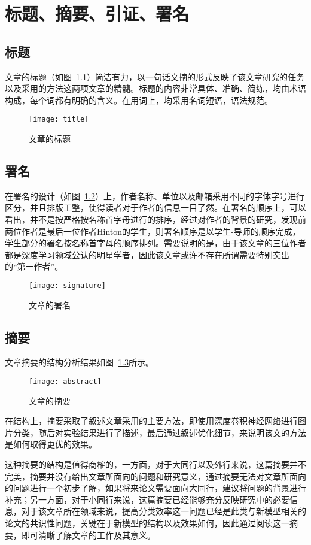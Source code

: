 \chapter{标题、摘要、引证、署名}\label{chap:other}
\section{标题}
文章的标题（如图~\ref{fig:title}）简洁有力，以一句话文摘的形式反映了该文章研究的任务以及采用的方法这两项文章的精髓。标题的内容非常具体、准确、简练，均由术语构成，每个词都有明确的含义。在用词上，均采用名词短语，语法规范。

\begin{figure}[!htbp]
	\centering
	\texttt{[image: title]}
	\caption{文章的标题}
	\label{fig:title}
\end{figure}

\section{署名}
在署名的设计（如图~\ref{fig:signature}）上，作者名称、单位以及邮箱采用不同的字体字号进行区分，并且排版工整，使得读者对于作者的信息一目了然。在署名的顺序上，可以看出，并不是按严格按名称首字母进行的排序，经过对作者的背景的研究，发现前两位作者是最后一位作者Hinton的学生，则署名顺序是以学生-导师的顺序完成，学生部分的署名按名称首字母的顺序排列。需要说明的是，由于该文章的三位作者都是深度学习领域公认的明星学者，因此该文章或许不存在所谓需要特别突出的“第一作者”。
\begin{figure}[!htbp]
	\centering
	\texttt{[image: signature]}
	\caption{文章的署名}
	\label{fig:signature}
\end{figure}

\section{摘要}
文章摘要的结构分析结果如图~\ref{fig:abstract}所示。

\begin{figure}[!htbp]
	\centering
	\texttt{[image: abstract]}
	\caption{文章的摘要}
	\label{fig:abstract}
\end{figure}

在结构上，摘要采取了叙述文章采用的主要方法，即使用深度卷积神经网络进行图片分类，随后对实验结果进行了描述，最后通过叙述优化细节，来说明该文的方法是如何取得更优的效果。

这种摘要的结构是值得商榷的，一方面，对于大同行以及外行来说，这篇摘要并不完美，摘要并没有给出文章所面向的问题和研究意义，通过摘要无法对文章所面向的问题进行一个初步了解，如果将来论文需要面向大同行，建议将问题的背景进行补充；另一方面，对于小同行来说，这篇摘要已经能够充分反映研究中的必要信息，对于该文章所在领域来说，提高分类效率这一问题已经是此类与新模型相关的论文的共识性问题，关键在于新模型的结构以及效果如何，因此通过阅读这一摘要，即可清晰了解文章的工作及其意义。

